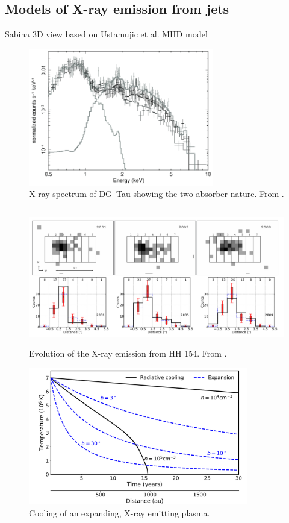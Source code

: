 \documentclass[graybox, nosecnum]{svmult}
\begin{document}
\subsection{Models of X-ray emission from jets}
{\color{blue}Sabina
3D view based on Ustamujic et al. MHD model}



\begin{figure}[t]
\centering

\includegraphics[height=6cm]{figs/tax}
\caption{X-ray spectrum of DG~Tau showing the two absorber nature. From \citet{}. \label{fig:tax}}
\end{figure}



\begin{figure}[t]
\centering

\includegraphics[height=6cm]{figs/hh154}
\caption{Evolution of the X-ray emission from HH 154. From \citet{Schneider_2011}. \label{fig:hh154}}
\end{figure}


\begin{figure}[t]
\centering

\includegraphics[height=6cm]{figs/cooling}
\caption{Cooling of an expanding, X-ray emitting plasma. \label{fig:cooling}}
\end{figure}
\end{document}
